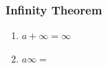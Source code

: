 \documentclass{article}
\begin{document}
 
 
 
\subsubsection{Infinity Theorem}
\begin{enumerate}
	\item $a + \infty = \infty$
	\item $a\infty =$
\end{enumerate}
 
 
 
 
 
 
 
 
 
 
 
 
 
 
 
 
 
 
 
\end{document}
